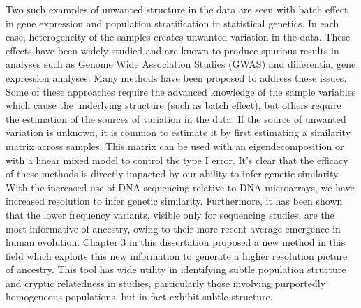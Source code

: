 Two such examples of unwanted structure in the data are seen with batch effect in gene expression and population stratification in statistical genetics.  In each case, heterogeneity of the samples creates unwanted variation in the data.  These effects have been widely studied and are known to produce spurious results in analyses such as Genome Wide Association Studies (GWAS) and differential gene expression analyses.  Many methods have been proposed to address these issues.  Some of these approaches require the advanced knowledge of the sample variables which cause the underlying structure (such as batch effect), but others require the estimation of the sources of variation in the data.  If the source of unwanted variation is unknown, it is common to estimate it by first estimating a similarity matrix across samples.  This matrix can be used with an eigendecomposition or with a linear mixed model to control the type I error.  It's clear that the efficacy of these methods is directly impacted by our ability to infer genetic similarity.  With the increased use of DNA sequencing relative to DNA microarrays, we have increased resolution to infer genetic similarity.  Furthermore, it has been shown that the lower frequency variants, visible only for sequencing studies, are the most informative of ancestry, owing to their more recent average emergence in human evolution.  Chapter 3 in this dissertation proposed a new method in this field which exploits this new information to generate a higher resolution picture of ancestry.  This tool has wide utility in identifying subtle population structure and cryptic relatedness in studies, particularly those involving purportedly homogeneous populations, but in fact exhibit subtle structure.  

